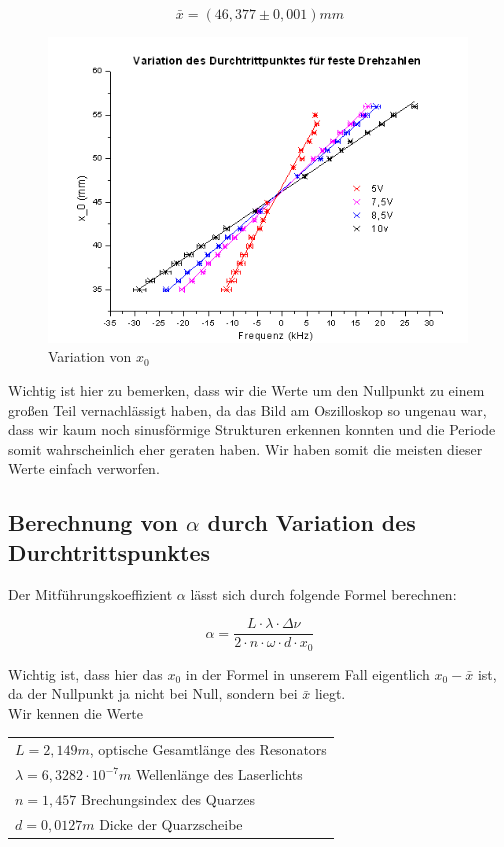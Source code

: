 $$\boxed{\bar x = (46,377 \pm 0,001) mm}$$

\begin{figure}[H]
	\centering \includegraphics[width = 0.99\textwidth]{Bilder/graph1.jpg}
	\caption{Variation von $x_0$}
\end{figure}

Wichtig ist hier zu bemerken, dass wir die Werte um den Nullpunkt zu einem großen Teil vernachlässigt haben, da das Bild am Oszilloskop so ungenau war, dass wir kaum noch sinusförmige Strukturen erkennen konnten und die Periode somit wahrscheinlich eher geraten haben. Wir haben somit die meisten dieser Werte einfach verworfen.

\subsection{Berechnung von $\alpha$ durch Variation des Durchtrittspunktes}

Der Mitführungskoeffizient $\alpha$ lässt sich durch folgende Formel berechnen:

$$\alpha = \frac{L\cdot\lambda\cdot\Delta\nu}{2\cdot n\cdot\omega\cdot d \cdot x_0}$$

Wichtig ist, dass hier das $x_0$ in der Formel in unserem Fall eigentlich $x_0 - \bar x$ ist, da der Nullpunkt ja nicht bei Null, sondern bei $\bar x$ liegt.\\

Wir kennen die Werte\\

\begin{tabular}[H]{l}
$L = 2,149 m$, optische Gesamtlänge des Resonators\\
$\lambda = 6,3282\cdot10^{-7} m$ Wellenlänge des Laserlichts\\
$n = 1,457$ Brechungsindex des Quarzes\\
$d = 0,0127 m$ Dicke der Quarzscheibe
\end{tabular}\\


